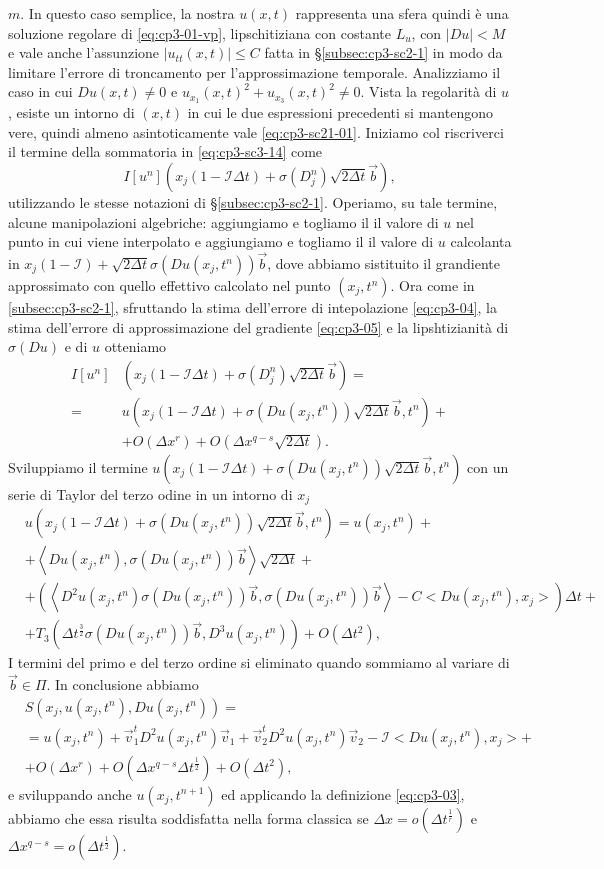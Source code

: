 $m$. In questo caso semplice, la nostra $u(x,t)$ rappresenta una sfera
quindi è una soluzione regolare di \eqref{eq:cp3-01-vp},
lipschitiziana con costante $L_u$, con $|Du|<M$ e vale anche
l'assunzione $|u_{tt}(x,t)|\leq C$ fatta in §\ref{subsec:cp3-sc2-1} in modo
da limitare l'errore di troncamento per l'approssimazione
temporale. Analizziamo il caso in cui $Du(x,t)\ne 0$ e
$u_{x_1}(x,t)^2+u_{x_3}(x,t)^2\ne 0$. Vista la regolarità di $u$,
esiste un intorno di $(x,t)$ in cui le due espressioni precedenti si
mantengono vere, quindi almeno asintoticamente vale
\eqref{eq:cp3-sc21-01}.  Iniziamo col riscriverci il termine della
sommatoria in \eqref{eq:cp3-sc3-14} come
\[
I[u^n](x_j(1-\mathcal{I}\Delta t)+\sigma(D_j^n)\sqrt{2\Delta t}\vec{b}),
\]
utilizzando le stesse notazioni di §\ref{subsec:cp3-sc2-1}. Operiamo,
su tale termine, alcune manipolazioni algebriche: aggiungiamo e togliamo
il il valore di $u$ nel punto in cui viene interpolato e aggiungiamo e
togliamo il il valore di $u$ calcolanta in
$x_j(1-\mathcal{I})+\sqrt{2\Delta t}\sigma(Du(x_j,t^n))\vec{b}$, dove
abbiamo sistituito il grandiente approssimato con quello effettivo
calcolato nel punto $(x_j,t^n)$. Ora come in \ref{subsec:cp3-sc2-1},
sfruttando la stima dell'errore di intepolazione \eqref{eq:cp3-04}, la
stima dell'errore di approssimazione del gradiente \eqref{eq:cp3-05} e
la lipshtizianità di $\sigma(Du)$ e di $u$ otteniamo
\[
\begin{split}
I[u^n]&(x_j(1-\mathcal{I}\Delta t)+\sigma(D_j^n)\sqrt{2\Delta
    t}\vec{b})=\\
=&u(x_j(1-\mathcal{I}\Delta t) +\sigma(Du(x_j,t^n))\sqrt{2\Delta t}\vec{b},t^n) +\\
&+O(\Delta x^r)+O(\Delta x^{q-s}\sqrt{2\Delta t}).
\end{split}
\]
Sviluppiamo il termine $u(x_j(1-\mathcal{I}\Delta t)
+\sigma(Du(x_j,t^n))\sqrt{2\Delta t}\vec{b},t^n)$ con un serie di
Taylor del terzo odine in un intorno di $x_j$
\[
\begin{split}
&u(x_j(1-\mathcal{I}\Delta t)+\sigma(Du(x_j,t^n))\sqrt{2\Delta t}\vec{b},t^n) = u(x_j,t^n)+ \\
&+\left<Du(x_j,t^n),\sigma(Du(x_j,t^n))\vec{b}\right>\sqrt{2\Delta t} +\\
&+\left(\left<D^2u(x_j,t^n)\sigma(Du(x_j,t^n))\vec{b},\sigma(Du(x_j,t^n))\vec{b}\right>-C<Du(x_j,t^n),x_j>\right)\Delta t + \\
&+T_3(\Delta t^{\frac{3}{2}}\sigma(Du(x_j,t^n))\vec{b},D^3u(x_j,t^n))+O(\Delta t^2), 
\end{split}
\]
I termini del primo e del terzo ordine
si eliminato quando sommiamo al variare di $\vec{b}\in\Pi$. In
conclusione abbiamo
\[
\begin{split}
& S(x_j,u(x_j,t^n),Du(x_j,t^n)) = \\
& = u(x_j,t^n) + \vec{v}_1^tD^2u(x_j,t^n)\vec{v}_1 + \vec{v}_2^tD^2u(x_j,t^n)\vec{v}_2 -\mathcal{I}<Du(x_j,t^n),x_j>+ \\
& + O(\Delta x^r) + O(\Delta x^{q-s}\Delta t^{\frac{1}{2}}) + O(\Delta t^2),
\end{split}
\]
e sviluppando anche $u(x_j,t^{n+1})$ ed applicando la definizione
\eqref{eq:cp3-03}, abbiamo che essa risulta soddisfatta nella forma
classica se $\Delta x = o(\Delta t^{\frac{1}{r}})$ e $\Delta x^{q-s}=o(\Delta t^{\frac{1}{2}})$.
